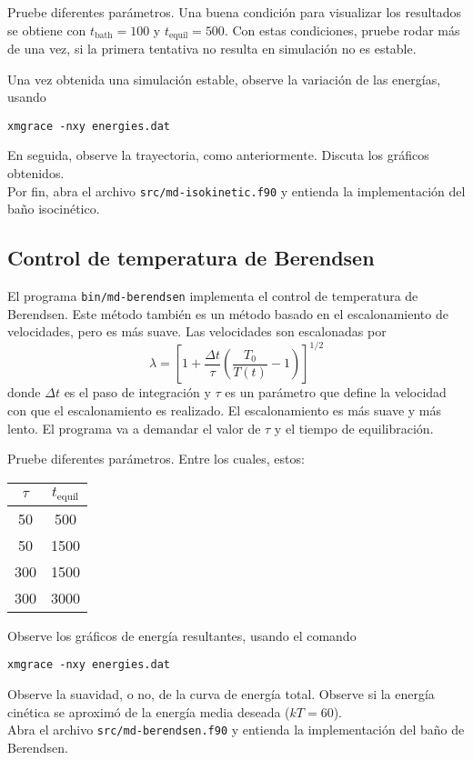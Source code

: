 \documentclass[10pt,a4paper,ssfamily]{exam}
\newcommand{\1}{{\bf 1}}
\newcommand{\2}{{\bf 2}}
\newcommand{\3}{{\bf 3}}
\newcommand{\command}[1]{\begin{center}{\tt #1}\end{center}}
\begin{document}
Pruebe diferentes parámetros. Una buena condición para visualizar los
resultados se obtiene con $t_{\mathrm{bath}}=100$ y
$t_{\mathrm{equil}}=500$. Con estas condiciones, pruebe rodar más de una
vez, si la primera tentativa no resulta en simulación no es estable.

Una vez obtenida una simulación estable, observe la variación de las
energías, usando 
\command{xmgrace -nxy energies.dat}
En seguida, observe la trayectoria, como anteriormente. Discuta los
gráficos obtenidos. \\

\noindent
Por fin, abra el archivo {\tt src/md-isokinetic.f90} y entienda la implementación
del baño isocinético.

\subsection{Control de temperatura de Berendsen}

El programa {\tt bin/md-berendsen} implementa el control de temperatura
de Berendsen. Este método también es un método basado en el
escalonamiento de velocidades, pero es más suave. Las velocidades son
escalonadas por
\[
\lambda = \left[  
1 + \frac{\Delta t}{\tau} \left(
\frac{T_0}{T(t)} -1
\right)
\right]^{1/2}
\]
donde $\Delta t$ es el paso de integración y $\tau$ es un parámetro que
define la velocidad con que el escalonamiento es realizado. El
escalonamiento es más suave y más lento. El programa va a demandar el
valor de $\tau$ y el tiempo de equilibración. 

Pruebe diferentes parámetros. Entre los cuales, estos: 
{\tt \begin{center}\begin{tabular}{cc}
\hline
  $\tau$ & $t_{\mathrm{equil}}$ \\
\hline
    50   &  500 \\
    50   &  1500 \\
   300   &  1500 \\
   300   &  3000 \\
\hline
\end{tabular}\end{center}}
Observe los gráficos de energía resultantes, usando el comando
\command{xmgrace -nxy energies.dat}
Observe la suavidad, o no, de la curva de energía total. Observe si la
energía cinética se aproximó de la energía media deseada ($kT=60$).\\

\noindent
Abra el archivo {\tt src/md-berendsen.f90} y entienda la implementación
del baño de Berendsen.
\end{document}
